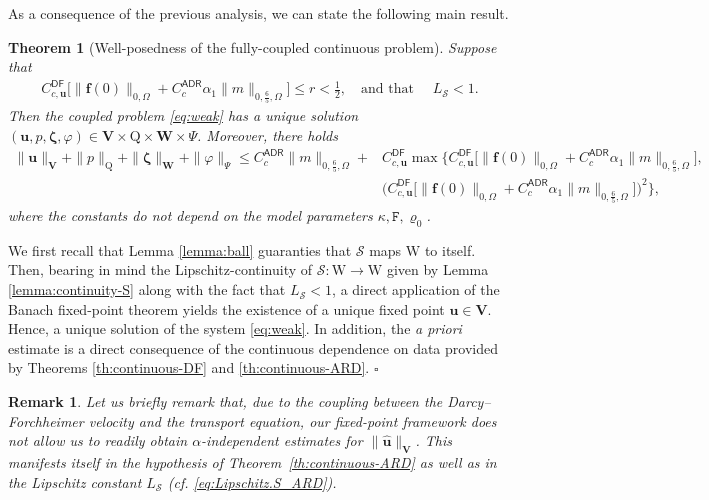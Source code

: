 \documentclass[11pt, reqno, a4paper, twoside]{article}
\newcommand{\bu}{\boldsymbol{u}}
\renewcommand{\bf}{\boldsymbol{f}}
\newcommand\bzeta{\boldsymbol{\zeta}}
\newcommand{\rF}{\mathtt{F}}
\newcommand{\rW}{\mathrm{W}}
\newcommand{\rQ}{\mathrm{Q}}
\newcommand{\bW}{\mathbf{W}}
\newcommand{\bV}{\mathbf{V}}
\newcommand{\cS}{\mathcal{S}}
\newtheorem{remark}{Remark}[section]
\newtheorem{theorem}{Theorem}[section]
\newenvironment{proof}{\noindent{\it Proof.}}{\hfill$\square$}
\numberwithin{equation}{section}
\numberwithin{remark}{section}
\numberwithin{figure}{section}
\numberwithin{table}{section}
\newcommand{\rrb}[1]{{\leavevmode\color{lightgreen}{#1}}}
\begin{document}
{As a consequence of the previous analysis, we can state the following main result. 
\begin{theorem}[Well-posedness of the fully-coupled continuous problem]\label{th:wellposedness}
 Suppose that \begin{align*}{C^{\mathsf{DF}}_{c,\bu}}\bigl[{\|\bf(0)\|_{0,\Omega}}+C^{\mathsf{ADR}}_{c}\alpha_1\|m\|_{0,\frac65,\Omega}\bigr]  \leq r<\frac12,\quad \text{and
that } \quad L_{\cS}<1. \end{align*}
Then the coupled problem \eqref{eq:weak} has a unique solution $(\bu,p,\bzeta,\varphi) \in \bV \times \rQ\times \bW \times \Psi$. Moreover, there holds 
\begin{align*}
    \|\bu\|_{\bV} + \|p\|_{\rQ} + \|\bzeta\|_{\bW} + \|\varphi\|_{\Psi} 
  \leq  C^{\mathsf{ADR}}_{c}\|m\|_{0,\frac65,\Omega}+&{C^{\mathsf{DF}}_{c,\bu}}\max \biggl\{{C^{\mathsf{DF}}_{c,\bu}}\bigl[{\|\bf(0)\|_{0,\Omega}}+C^{\mathsf{ADR}}_{c}\alpha_1\|m\|_{0,\frac65,\Omega}\bigr],\\&\bigl({C^{\mathsf{DF}}_{c,\bu}}\bigl[{\|\bf(0)\|_{0,\Omega}}+C^{\mathsf{ADR}}_{c}\alpha_1\|m\|_{0,\frac65,\Omega}\bigr]\bigr)^2\biggr\}, \label{estimate su}
\end{align*}
where the constants do not depend on the model parameters $\kappa,\rF,\varrho_0$. %
\end{theorem}
\begin{proof}
We first recall that Lemma \ref{lemma:ball} guaranties that $\cS$ maps $\rW$ to itself. Then, bearing in mind the Lipschitz-continuity of $\cS : \rW \to \rW$ given by Lemma \ref{lemma:continuity-S} along with the fact that $L_{\cS}<1$, a direct application of the Banach fixed-point theorem yields the existence of a unique fixed point $\bu \in \bV.$ Hence, a unique solution of the system \eqref{eq:weak}. In addition, the {\it a priori} estimate is a direct consequence of the continuous dependence on data provided by Theorems \ref{th:continuous-DF} and \ref{th:continuous-ARD}.
\end{proof}
\begin{remark}
   {Let us briefly remark that, due to the coupling between the Darcy--Forchheimer velocity and the transport {equation, our  fixed-point framework does not allow us to readily} obtain $\alpha$-independent estimates for $\|\hat{\bu}\|_{\bV}$. {This manifests itself} in the hypothesis of Theorem~\ref{th:continuous-ARD} {as well as in}  the Lipschitz constant $L_{\mathcal{S}}$ (cf.  \eqref{eq:Lipschitz.S_ARD}). }
\end{remark}
}
\end{document}
